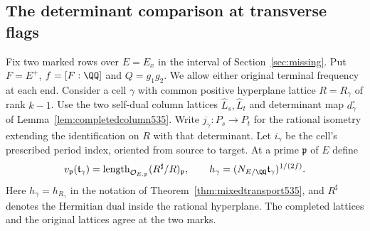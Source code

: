 \documentclass[a4paper,11pt]{article}
\theoremstyle{definition}
\theoremstyle{remark}
\numberwithin{equation}{section}
\begin{document}
\subsection{The determinant comparison at transverse flags}
\label{sec:cofactor581}

Fix two marked rows over \(E=E_x\) in the interval of
Section~\ref{sec:missing}. Put \(F=E^+\), \(f=[F:\QQ]\) and
\(Q=g_1g_2\). We allow either original terminal frequency at
each end. Consider a cell \(\gamma\) with common positive
hyperplane lattice \(R=R_\gamma\) of rank \(k-1\).
Use the two self-dual column lattices \(\widehat L_s,\widehat L_t\)
and determinant map \(d_\gamma^\circ\) of
Lemma~\ref{lem:completedcolumn535}. Write \(j_\gamma:P_s\to P_t\)
for the rational isometry extending the identification on \(R\)
with that determinant. Let \(i_\gamma\) be the cell's prescribed
period index, oriented from source to target. At a prime
\(\mathfrak p\) of \(E\) define
\[
 v_{\mathfrak p}(\mathfrak t_\gamma)
   =\operatorname{length}_{\mathcal O_{E,\mathfrak p}}
        (R^\sharp/R)_{\mathfrak p},\qquad
 h_\gamma=(N_{E/\QQ}\mathfrak t_\gamma)^{1/(2f)} .
\]
Here \(h_\gamma=h_{R_\gamma}\) in the notation of
Theorem~\ref{thm:mixedtransport535}, and \(R^\sharp\) denotes the
Hermitian dual inside the rational hyperplane. The completed lattices and the original lattices
agree at the two marks.
\end{document}
